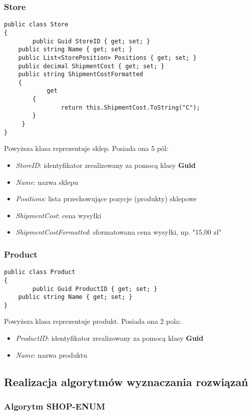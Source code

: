 \documentclass[a4paper]{article}
\begin{document}
\subsubsection{Store}
\lstset{style=sharpc}
\begin{lstlisting}
public class Store
{           
		public Guid StoreID { get; set; }
    public string Name { get; set; }
    public List<StorePosition> Positions { get; set; }
    public decimal ShipmentCost { get; set; }
    public string ShipmentCostFormatted
    {
    		get
        {
        		return this.ShipmentCost.ToString("C");
        }
     }
}
\end{lstlisting}
\begin{flushleft}
Powyższa klasa reprezentuje sklep. Posiada ona 5 pól: 
\begin{itemize}
\item \textit{StoreID}: identyfikator zrealizowany za pomocą klasy \textbf{Guid} 
\item \textit{Name}: nazwa sklepu
\item \textit{Positions}: lista przechowujące pozycje (produkty) sklepowe
\item \textit{ShipmentCost}: cena wysyłki
\item \textit{ShipmentCostFormatted}: sformatowana cena wysyłki, np. "15,00 zł"
\end{itemize}
\end{flushleft}
\subsubsection{Product}
\lstset{style=sharpc}
\begin{lstlisting}
public class Product
{     
		public Guid ProductID { get; set; }      
    public string Name { get; set; }        
}
\end{lstlisting}
\begin{flushleft}
Powyższa klasa reprezentuje produkt. Posiada ona 2 pola: 
\begin{itemize}
\item \textit{ProductID}: identyfikator zrealizowany za pomocą klasy \textbf{Guid} 
\item \textit{Name}: nazwa produktu
\end{itemize}
\end{flushleft}
\subsection{Realizacja algorytmów wyznaczania rozwiązań}
\subsubsection{Algorytm SHOP-ENUM}
\end{document}

